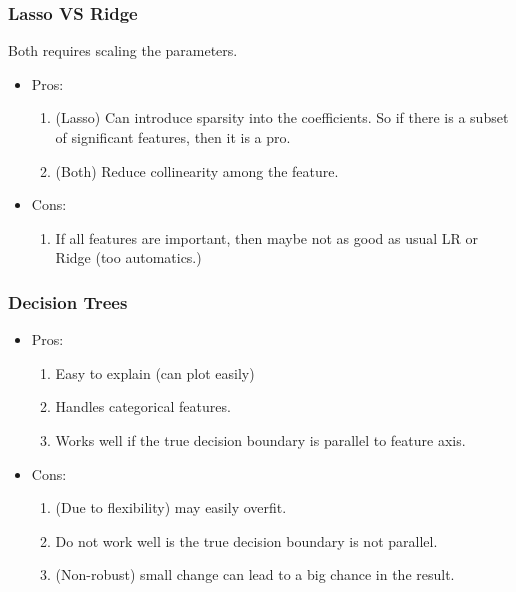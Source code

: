 \documentclass[12pt]{amsart}
\numberwithin{equation}{section}
\theoremstyle{plain}
\theoremstyle{definition}
\begin{document}
\subsubsection{Lasso VS Ridge}
Both requires scaling the parameters.
\begin{itemize}
\item Pros:

\begin{enumerate}
\item (Lasso) Can introduce sparsity into the coefficients. So if there is a subset of significant features, then it is a pro.
\item (Both) Reduce collinearity among the feature.
\end{enumerate}

\item Cons:

\begin{enumerate}
\item If all features are important, then maybe not as good as usual LR or Ridge (too automatics.)
\end{enumerate}

\end{itemize}

\subsubsection{Decision Trees}

\begin{itemize}
\item Pros: 

\begin{enumerate}
\item Easy to explain (can plot easily)
\item Handles categorical features.
\item Works well if the true decision boundary is parallel to feature axis.
\end{enumerate}

\item Cons:

\begin{enumerate}
\item (Due to flexibility) may easily overfit.
\item Do not work well is the true decision boundary is not parallel.
\item (Non-robust) small change can lead to a big chance in the result.
\end{enumerate}

\end{itemize}
\end{document}
